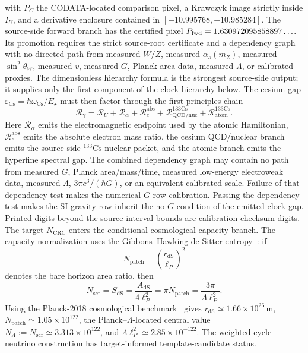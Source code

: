 \documentclass[11pt]{article}
\begin{document}
with \(P_C\) the CODATA-located comparison pixel,
a Krawczyk image strictly inside \(I_U\), and a derivative enclosure contained in
\([-10.995768,\allowbreak -10.985284]\). The source-side forward branch has
the certified pixel \(P_{\rm fwd}=1.630972095858897\ldots\). Its promotion
requires the strict source-root certificate and a dependency graph with no
directed path from measured \(W/Z\), measured \(\alpha_s(m_Z)\), measured
\(\sin^2\theta_W\), measured \(v\), measured \(G\), Planck-area data, measured
\(\Lambda\), or calibrated proxies. The dimensionless hierarchy formula
is the strongest source-side output; it supplies only the first
component of the clock hierarchy below. The cesium gap
\(\varepsilon_{\mathrm{Cs}}=\hbar\omega_{\mathrm{Cs}}/E_\star\) must then factor through the
first-principles chain
\[
\mathcal R_\gamma
=
\mathcal R_U
+
\mathcal R_\alpha
+
\mathcal R_e^{\mathrm{abs}}
+
\mathcal R_{\mathrm{QCD/nuc}}^{133\mathrm{Cs}}
+
\mathcal R_{\mathrm{atom}}^{133\mathrm{Cs}}.
\]
Here \(\mathcal R_\alpha\) emits the electromagnetic endpoint used by the atomic Hamiltonian,
\(\mathcal R_e^{\mathrm{abs}}\) emits the absolute electron mass ratio, the cesium
QCD/nuclear branch emits the source-side \({}^{133}\mathrm{Cs}\) nuclear packet, and the atomic
branch emits the hyperfine spectral gap. The combined dependency graph may contain no path from
measured \(G\), Planck area/mass/time, measured low-energy electroweak data, measured
\(\Lambda\), \(3\pi c^3/(\hbar G)\), or an equivalent calibrated scale. Failure of that
dependency test makes the numerical \(G\) row calibration. Passing the dependency test makes the
SI gravity row inherit the no-\(G\) condition of the emitted clock gap. Printed digits beyond the
source interval bounds are calibration checksum digits.
The target \(N_{\mathrm{CRC}}\) enters the conditional cosmological-capacity branch. The capacity normalization uses the
Gibbons--Hawking de Sitter entropy~\cite{gibbonsHawking77}: if
\[
N_{\mathrm{patch}}=\left(\frac{r_{\mathrm{dS}}}{\ell_P}\right)^2
\]
denotes the bare horizon area ratio, then
\[
N_{\mathrm{scr}}=S_{\mathrm{dS}}=\frac{A_{\mathrm{dS}}}{4\ell_P^2}
=\pi N_{\mathrm{patch}}
=\frac{3\pi}{\Lambda\ell_P^2}.
\]
Using the Planck-2018 cosmological benchmark~\cite{planck18} gives
\(r_{\mathrm{dS}}\simeq1.66\times10^{26}\,\mathrm m\),
\(N_{\mathrm{patch}}\simeq1.05\times10^{122}\),
the Planck--\(\Lambda\)-located central value
\(N_{\Lambda}:=N_{\mathrm{scr}}\simeq3.313\times10^{122}\), and
\(\Lambda\ell_P^2\simeq2.85\times10^{-122}\). The weighted-cycle neutrino
construction has target-informed template-candidate status.
\end{document}
